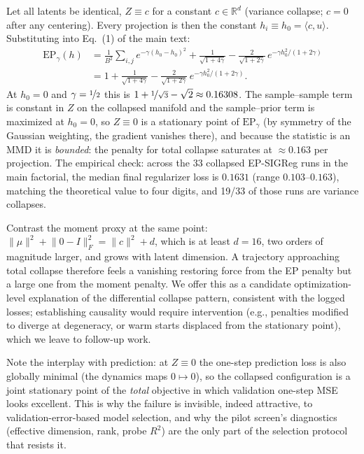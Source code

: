 Let all latents be identical, $Z\equiv c$ for a constant $c\in\mathbb{R}^d$ (variance collapse; $c=0$ after any centering). Every projection is then the constant $h_i\equiv h_0=\langle c,u\rangle$. Substituting into Eq.~(1) of the main text:
\begin{align}
\mathrm{EP}_\gamma(h) &= \frac{1}{B^2}\sum_{i,j} e^{-\gamma(h_0-h_0)^2} + \frac{1}{\sqrt{1+4\gamma}} - \frac{2}{\sqrt{1+2\gamma}}\, e^{-\gamma h_0^2/(1+2\gamma)} \nonumber\\
&= 1 + \frac{1}{\sqrt{1+4\gamma}} - \frac{2}{\sqrt{1+2\gamma}}\, e^{-\gamma h_0^2/(1+2\gamma)}.
\end{align}
At $h_0=0$ and $\gamma=\nicefrac12$ this is $1+\nicefrac{1}{\sqrt3}-\sqrt2\approx 0.16308$. The sample--sample term is constant in $Z$ on the collapsed manifold and the sample--prior term is maximized at $h_0=0$, so $Z\equiv0$ is a stationary point of $\mathrm{EP}_\gamma$ (by symmetry of the Gaussian weighting, the gradient vanishes there), and because the statistic is an MMD it is \emph{bounded}: the penalty for total collapse saturates at $\approx0.163$ per projection. The empirical check: across the 33 collapsed EP-SIGReg runs in the main factorial, the median final regularizer loss is $0.1631$ (range $0.103$--$0.163$), matching the theoretical value to four digits, and 19/33 of those runs are variance collapses.

Contrast the moment proxy at the same point: $\lVert\mu\rVert^2+\lVert 0 - I\rVert_F^2 = \lVert c\rVert^2 + d$, which is at least $d=16$, two orders of magnitude larger, and grows with latent dimension. A trajectory approaching total collapse therefore feels a vanishing restoring force from the EP penalty but a large one from the moment penalty. We offer this as a candidate optimization-level explanation of the differential collapse pattern, consistent with the logged losses; establishing causality would require intervention (e.g., penalties modified to diverge at degeneracy, or warm starts displaced from the stationary point), which we leave to follow-up work.

Note the interplay with prediction: at $Z\equiv0$ the one-step prediction loss is also globally minimal (the dynamics maps $0\mapsto0$), so the collapsed configuration is a joint stationary point of the \emph{total} objective in which validation one-step MSE looks excellent. This is why the failure is invisible, indeed attractive, to validation-error-based model selection, and why the pilot screen's diagnostics (effective dimension, rank, probe $R^2$) are the only part of the selection protocol that resists it.

